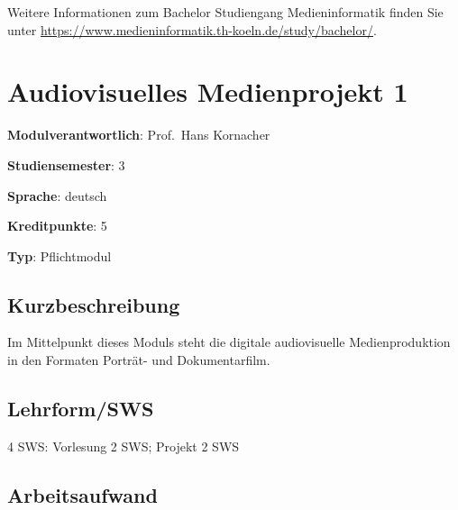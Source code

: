 Weitere Informationen zum Bachelor Studiengang Medieninformatik finden
Sie unter
\url{https://www.medieninformatik.th-koeln.de/study/bachelor/}.

\hypertarget{audiovisuelles-medienprojekt-1pathlabelmi-2017modulbeschreibungen-bachelorba_avm}{%
\chapter{Audiovisuelles Medienprojekt
1\label{/mi-2017/modulbeschreibungen-bachelor/BA_AVM}}\label{audiovisuelles-medienprojekt-1pathlabelmi-2017modulbeschreibungen-bachelorba_avm}}

\begin{modulHead}
\textbf{Modulverantwortlich}: Prof.~Hans
Kornacher
\end{modulHead}
\begin{modulHead}
\textbf{Studiensemester}:
3
\end{modulHead}
\begin{modulHead}
\textbf{Sprache}:
deutsch
\end{modulHead}
\begin{modulHead}
\textbf{Kreditpunkte}:
5
\end{modulHead}
\begin{modulHead}
\textbf{Typ}:
Pflichtmodul
\end{modulHead}


\hypertarget{kurzbeschreibungpathlabelmi-2017modulbeschreibungen-bachelorba_avm}{%
\section*{Kurzbeschreibung\label{/mi-2017/modulbeschreibungen-bachelor/BA_AVM}}\label{kurzbeschreibungpathlabelmi-2017modulbeschreibungen-bachelorba_avm}}

Im Mittelpunkt dieses Moduls steht die digitale audiovisuelle
Medienproduktion in den Formaten Porträt- und Dokumentarfilm.

\hypertarget{lehrformswspathlabelmi-2017modulbeschreibungen-bachelorba_avm}{%
\section*{Lehrform/SWS\label{/mi-2017/modulbeschreibungen-bachelor/BA_AVM}}\label{lehrformswspathlabelmi-2017modulbeschreibungen-bachelorba_avm}}

4 SWS: Vorlesung 2 SWS; Projekt 2 SWS

\hypertarget{arbeitsaufwandpathlabelmi-2017modulbeschreibungen-bachelorba_avm}{%
\section*{Arbeitsaufwand\label{/mi-2017/modulbeschreibungen-bachelor/BA_AVM}}\label{arbeitsaufwandpathlabelmi-2017modulbeschreibungen-bachelorba_avm}}

